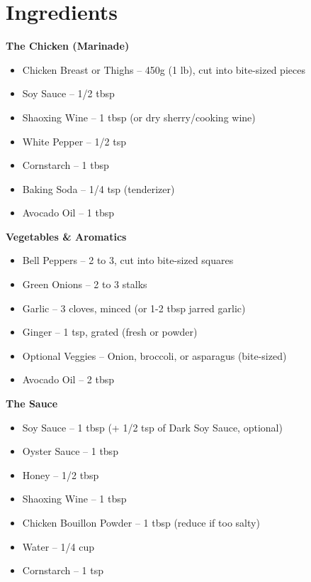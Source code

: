 




\section*{Ingredients}

\textbf{The Chicken (Marinade)}
\begin{itemize}[itemsep=0.1em, label={\raisebox{-0.1ex}{\large\textbullet}}]
    \item[\cut] Chicken Breast or Thighs – 450g (1 lb), cut into bite-sized pieces
    \item[\measure] Soy Sauce – 1/2 tbsp
    \item[\measure] Shaoxing Wine – 1 tbsp (or dry sherry/cooking wine)
    \item[\measure] White Pepper – 1/2 tsp
    \item[\measure] Cornstarch – 1 tbsp
    \item[\measure] Baking Soda – 1/4 tsp (tenderizer)
    \item[\measure] Avocado Oil – 1 tbsp
\end{itemize}

\textbf{Vegetables \& Aromatics}
\begin{itemize}[itemsep=0.1em, label={\raisebox{-0.1ex}{\large\textbullet}}]
    \item[\cut] Bell Peppers – 2 to 3, cut into bite-sized squares
    \item[\cut] Green Onions – 2 to 3 stalks
    \item[\cut] Garlic – 3 cloves, minced (or 1-2 tbsp jarred garlic)
    \item[\cut] Ginger – 1 tsp, grated (fresh or powder)
    \item[\cut] Optional Veggies – Onion, broccoli, or asparagus (bite-sized)
    \item[\measure] Avocado Oil – 2 tbsp
\end{itemize}

\textbf{The Sauce}
\begin{itemize}[itemsep=0.1em, label={\raisebox{-0.1ex}{\large\textbullet}}]
    \item[\measure] Soy Sauce – 1 tbsp (+ 1/2 tsp of Dark Soy Sauce, optional)
    \item[\measure] Oyster Sauce – 1 tbsp
    \item[\measure] Honey – 1/2 tbsp
    \item[\measure] Shaoxing Wine – 1 tbsp
    \item[\measure] Chicken Bouillon Powder – 1 tbsp (reduce if too salty)
    \item[\measure] Water – 1/4 cup
    \item[\measure] Cornstarch – 1 tsp
\end{itemize}

